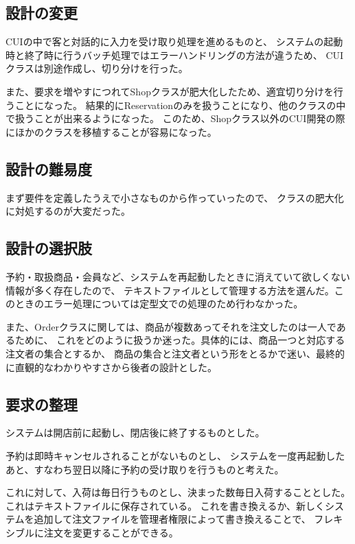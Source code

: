 \documentclass[a4paper,11pt]{jsarticle}
\begin{document}
\subsection{設計の変更}

CUIの中で客と対話的に入力を受け取り処理を進めるものと、
システムの起動時と終了時に行うバッチ処理ではエラーハンドリングの方法が違うため、
CUIクラスは別途作成し、切り分けを行った。

また、要求を増やすにつれてShopクラスが肥大化したため、適宜切り分けを行うことになった。
結果的にReservationのみを扱うことになり、他のクラスの中で扱うことが出来るようになった。
このため、Shopクラス以外のCUI開発の際にほかのクラスを移植することが容易になった。

\subsection{設計の難易度}

まず要件を定義したうえで小さなものから作っていったので、
クラスの肥大化に対処するのが大変だった。


\subsection{設計の選択肢}

予約・取扱商品・会員など、システムを再起動したときに消えていて欲しくない情報が多く存在したので、
テキストファイルとして管理する方法を選んだ。このときのエラー処理については定型文での処理のため行わなかった。

また、Orderクラスに関しては、商品が複数あってそれを注文したのは一人であるために、
これをどのように扱うか迷った。具体的には、商品一つと対応する注文者の集合とするか、
商品の集合と注文者という形をとるかで迷い、最終的に直観的なわかりやすさから後者の設計とした。


\subsection{要求の整理}

システムは開店前に起動し、閉店後に終了するものとした。

予約は即時キャンセルされることがないものとし、
システムを一度再起動したあと、すなわち翌日以降に予約の受け取りを行うものと考えた。

これに対して、入荷は毎日行うものとし、決まった数毎日入荷することとした。これはテキストファイルに保存されている。
これを書き換えるか、新しくシステムを追加して注文ファイルを管理者権限によって書き換えることで、
フレキシブルに注文を変更することができる。
\end{document}
